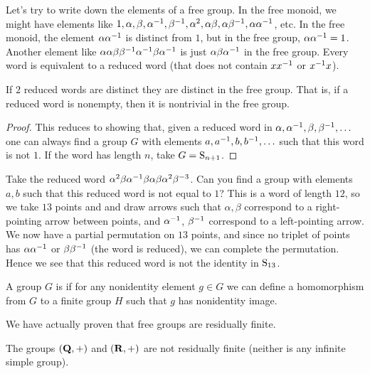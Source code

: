 \documentclass[11pt, oneside]{amsart}
\begin{document}
Let's try to write down the elements of a free group. In the free monoid, we might have elements like $1,\alpha,\beta,\alpha^{-1},\beta^{-1},\alpha^2,\alpha\beta,\alpha\beta^{-1}, \alpha\alpha^{-1}$, etc. In the free monoid, the element $\alpha\alpha^{-1}$ is distinct from $1$, but in the free group, $\alpha\alpha^{-1} =1$. Another element like $\alpha\alpha\beta\beta^{-1} \alpha^{-1}\beta\alpha^{-1}$ is just $\alpha\beta\alpha^{-1}$ in the free group. Every word is equivalent to a reduced word (that does not contain $xx^{-1}$ or $x^{-1} x$). 

\begin{proposition}
If $2$ reduced words are distinct they are distinct in the free group. That is, if a reduced word is nonempty, then it is nontrivial in the free group.
\end{proposition}
\begin{proof}
This reduces to showing that, given a reduced word in $\alpha,\alpha^{-1},\beta,\beta^{-1},\hdots$ one can always find a group $G$ with elements $a,a^{-1},b,b^{-1},\hdots$ such that this word is not $1$. If the word has length $n$, take $G=\operatorname{S}_{n+1}$.
\end{proof}
\begin{example} %
Take the reduced word $\alpha^2\beta\alpha^{-1}\beta\alpha\beta\alpha^2\beta^{-3}$. Can you find a group with elements $a,b$ such that this reduced word is not equal to $1$? This is a word of length $12$, so we take $13$ points and and draw arrows such that $\alpha,\beta$ correspond to a right-pointing arrow between points, and $\alpha^{-1}$, $\beta^{-1}$ correspond to a left-pointing arrow. We now have a partial permutation on $13$ points, and since no triplet of points has $\alpha\alpha^{-1}$ or $\beta\beta^{-1}$ (the word is reduced), we can complete the permutation. Hence we see that this reduced word is not the identity in $\operatorname{S}_{13}$.
\end{example}

\begin{definition}
A group $G$ is  if for any nonidentity element $g\in G$ we can define a homomorphism from $G$ to a finite group $H$ such that $g$ has nonidentity image.
\end{definition}

We have actually proven that free groups are residually finite. 
\begin{example}
The groups $(\mathbf Q,+)$ and $(\mathbf R,+)$ are not residually finite (neither is any infinite simple group).
\end{example}
\end{document}
